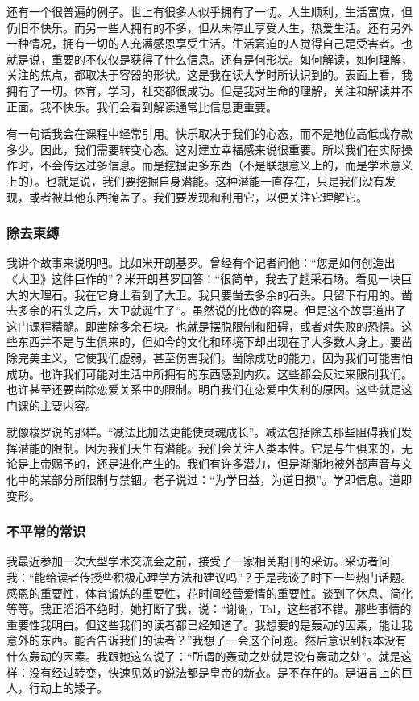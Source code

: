 还有一个很普遍的例子。世上有很多人似乎拥有了一切。人生顺利，生活富庶，但仍旧不快乐。而另一些人拥有的不多，但从未停止享受人生，热爱生活。还有另外一种情况，拥有一切的人充满感恩享受生活。生活窘迫的人觉得自己是受害者。也就是说，重要的不仅仅是获得了什么信息。还有是何形状。如何解读，如何理解，关注的焦点，都取决于容器的形状。这是我在读大学时所认识到的。表面上看，我拥有了一切。体育，学习，社交都很成功。但是我对生命的理解，关注和解读并不正面。我不快乐。我们会看到解读通常比信息更重要。

有一句话我会在课程中经常引用。快乐取决于我们的心态，而不是地位高低或存款多少。因此，我们需要转变心态。这对建立幸福感来说很重要。所以我们在实际操作时，不会传达过多信息。而是挖掘更多东西（不是联想意义上的，而是学术意义上的）。也就是说，我们要挖掘自身潜能。这种潜能一直存在，只是我们没有发现，或者被其他东西掩盖了。我们要发现和利用它，以便关注它理解它。

\subsubsection{除去束缚}
我讲个故事来说明吧。比如米开朗基罗。曾经有个记者问他：“您是如何创造出《大卫》这件巨作的”？米开朗基罗回答：“很简单，我去了趟采石场。看见一块巨大的大理石。我在它身上看到了大卫。我只要凿去多余的石头。只留下有用的。凿去多余的石头之后，大卫就诞生了”。虽然说的比做的容易。但是这个故事道出了这门课程精髓。即凿除多余石块。也就是摆脱限制和阻碍，或者对失败的恐惧。这些东西并不是与生俱来的，但如今的文化和环境下却出现在了大多数人身上。要凿除完美主义，它使我们虚弱，甚至伤害我们。凿除成功的能力，因为我们可能害怕成功。也许我们可能对生活中所拥有的东西感到内疚。这些都会反过来限制我们。也许甚至还要凿除恋爱关系中的限制。明白我们在恋爱中失利的原因。这些就是这门课的主要内容。 

就像梭罗说的那样。“减法比加法更能使灵魂成长”。减法包括除去那些阻碍我们发挥潜能的限制。因为我们天生有潜能。我们会关注人类本性。它是与生俱来的，无论是上帝赐予的，还是进化产生的。我们有许多潜力，但是渐渐地被外部声音与文化中的某部分所限制与禁锢。老子说过：“为学日益，为道日损”。学即信息。道即变形。 

\subsubsection{不平常的常识}
我最近参加一次大型学术交流会之前，接受了一家相关期刊的采访。采访者问我：“能给读者传授些积极心理学方法和建议吗”？于是我谈了时下一些热门话题。感恩的重要性，体育锻炼的重要性，花时间经营爱情的重要性。谈到了休息、简化等等。我正滔滔不绝时，她打断了我，说：“谢谢，Tal，这些都不错。那些事情的重要性我明白。但这些我们的读者都已经知道了。我想要的是轰动的因素，能让我意外的东西。能否告诉我们的读者？”我想了一会这个问题。然后意识到根本没有什么轰动的因素。我跟她这么说了：“所谓的轰动之处就是没有轰动之处”。就是这样：没有经过转变，快速见效的说法都是皇帝的新衣。是不存在的。是语言上的巨人，行动上的矮子。

